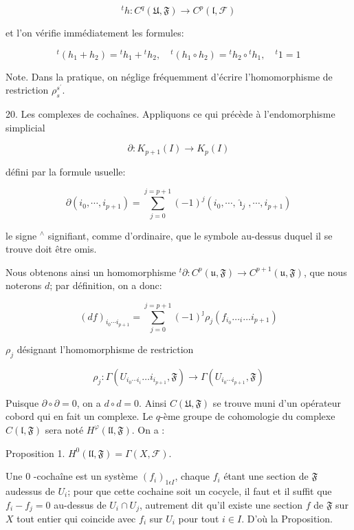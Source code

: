$$
{ }^{t} h: C^{q}(\mathfrak{U}, \mathfrak{F}) \rightarrow C^{p}(\mathfrak{l}, \mathcal{F})
$$

et l'on vérifie immédiatement les formules:

$$
{ }^{t}\left(h_{1}+h_{2}\right)={ }^{t} h_{1}+{ }^{t} h_{2}, \quad{ }^{t}\left(h_{1} \circ h_{2}\right)={ }^{t} h_{2} \circ{ }^{t} h_{1}, \quad{ }^{t} 1=1
$$

Note. Dans la pratique, on néglige fréquemment d'écrire l'homomorphisme de restriction $\rho_{s}^{s^{\prime}} .$

20. Les complexes de cochaînes. Appliquons ce qui précède à l'endomorphisme simplicial

$$
\partial: K_{p+1}(I) \rightarrow K_{p}(I)
$$

défini par la formule usuelle:

$$
\partial\left(i_{0}, \cdots, i_{p+1}\right)=\sum_{j=0}^{j=p+1}(-1)^{j}\left(i_{0}, \cdots, \hat{\imath}_{j}, \cdots, i_{p+1}\right)
$$

le signe $^{\wedge}$ signifiant, comme d'ordinaire, que le symbole au-dessus duquel il se trouve doit être omis.

Nous obtenons ainsi un homomorphisme ${ }^{t} \partial: C^{p}(\mathfrak{u}, \mathfrak{F}) \rightarrow C^{p+1}(\mathfrak{u}, \mathfrak{F})$, que nous noterons $d$; par définition, on a donc:

$$
(d f)_{i_{0} \cdots i_{p+1}}=\sum_{j=0}^{j=p+1}(-1)^{\jmath} \rho_{j}\left(f_{i_{0}} \ldots_{i} \ldots i_{p+1}\right)
$$

$\rho_{j}$ désignant l'homomorphisme de restriction

$$
\rho_{j}: \Gamma\left(U_{i_{0} \cdots i_{i}} \ldots i_{i_{p+1}}, \mathfrak{F}\right) \rightarrow \Gamma\left(U_{i_{0} \cdots i_{p+1}}, \mathfrak{F}\right)
$$

Puisque $\partial \circ \partial=0$, on a $d \circ d=0$. Ainsi $C(\mathfrak{U}, \mathfrak{F})$ se trouve muni d'un opérateur cobord qui en fait un complexe. Le $q$-ème groupe de cohomologie du complexe $C(\mathfrak{l}, \mathfrak{F})$ sera noté $H^{\varphi}(\mathfrak{l l}, \mathfrak{F}) .$ On a :

Proposition 1. $H^{0}(\mathfrak{l l}, \mathfrak{F})=\Gamma(X, \mathcal{F}) .$

Une 0 -cochaîne est un système $\left(f_{i}\right)_{1 \epsilon I}$, chaque $f_{i}$ étant une section de $\mathfrak{F}$ audessus de $U_{i}$; pour que cette cochaine soit un cocycle, il faut et il suffit que $f_{i}-f_{j}=0$ au-dessus de $U_{i} \cap U_{j}$, autrement dit qu'il existe une section $f$ de $\mathfrak{F}$ sur $X$ tout entier qui coincide avec $f_{i}$ sur $U_{i}$ pour tout $i \in I$. D'où la Proposition.

